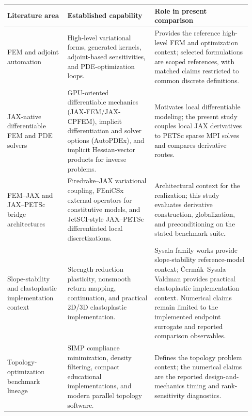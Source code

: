 \begin{tabular*}{\textwidth}{@{}>{\RaggedRight\arraybackslash}p{}@{\extracolsep{\fill}} >{\RaggedRight\arraybackslash}p{} >{\RaggedRight\arraybackslash}p{}@{}}
\toprule
Literature area & Established capability & Role in present comparison \\
\midrule
FEM and adjoint automation \citep{logg2012fenicsbook,baratta2025dolfinx,farrell2013dolfinadjoint,mitusch2019pyadjoint,blauth2023cashocsv2} & High-level variational forms, generated kernels, adjoint-based sensitivities, and PDE-optimization loops. & Provides the reference high-level FEM and optimization context; selected \fenics{} formulations are scoped references, with matched claims restricted to common discrete definitions. \\
JAX-native differentiable FEM and PDE solvers \citep{xue2023jaxfem,xue2026implicit,bode2025autopdex,hu2025jaxcpfem} & GPU-oriented differentiable mechanics (JAX-FEM/JAX-CPFEM), implicit differentiation and solver options (AutoPDEx), and implicit Hessian-vector products for inverse problems. & Motivates local differentiable modeling; the present study couples local JAX derivatives to PETSc sparse MPI solves and compares derivative routes. \\
FEM--JAX and JAX--PETSc bridge architectures \citep{yashchuk2023bringing,latyshev2025externaloperators,cattaneo2026jetsci} & Firedrake--JAX variational coupling, FEniCSx external operators for constitutive models, and JetSCI-style JAX--PETSc differentiated local discretizations. & Architectural context for the \jaxpetsc{} realization; this study evaluates derivative construction, globalization, and preconditioning on the stated benchmark suite. \\
Slope-stability and elastoplastic implementation context \citep{tschuchnigg2015nonassociated,sysala2017returnmapping,sysala2021optimization,sysala2025convexoptimization,sysala2025advancedcontinuation,cermak2019efficient} & Strength-reduction plasticity, nonsmooth return mapping, continuation, and practical 2D/3D elastoplastic implementation. & Sysala-family works provide slope-stability reference-model context; \v{C}erm{\'a}k--Sysala--Valdman provides practical elastoplastic implementation context. Numerical claims remain limited to the implemented endpoint surrogate and reported comparison observables. \\
Topology-optimization benchmark lineage \citep{sigmund2001topology,bendsoe2003topology,ferrari2020top99,bourdin2001filters,jia2024fenitop} & SIMP compliance minimization, density filtering, compact educational implementations, and modern parallel topology software. & Defines the topology problem context; the numerical claims are the reported design-and-mechanics timing and rank-sensitivity diagnostics. \\
\bottomrule
\end{tabular*}

